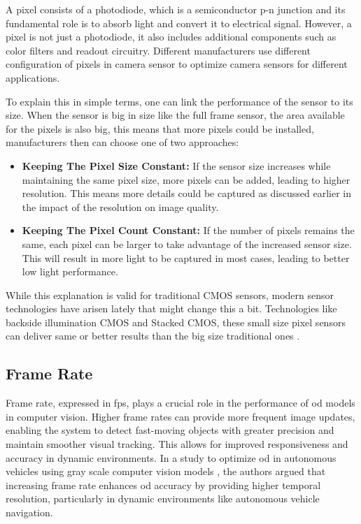 A pixel consists of a photodiode, which is a semiconductor p-n junction and its fundamental role is to absorb light and convert it to electrical signal.  However, a pixel is not just a photodiode, it also includes additional components such as color filters and readout circuitry. Different manufacturers use different configuration of pixels in camera sensor to optimize camera sensors for different applications.

To explain this in simple terms, one can link the performance of the sensor to its size. When the sensor is big in size like the full frame sensor, the area available for the pixels is also big, this means that more pixels could be installed, manufacturers then can choose one of two approaches:
\begin{itemize}
    \item \textbf{Keeping The Pixel Size Constant:} If the sensor size increases while maintaining the same pixel size, more pixels can be added, leading to higher resolution. This means more details could be captured as discussed earlier in the impact of the resolution on image quality.
    \item \textbf{Keeping The Pixel Count Constant:} If the number of pixels remains the same, each pixel can be larger to take advantage of the increased sensor size. This will result in more light to be captured in most cases, leading to better low light performance.
\end{itemize}


While this explanation is valid for traditional CMOS sensors, modern sensor technologies have arisen lately that might change this a bit. Technologies like backside illumination CMOS and Stacked CMOS, these small size pixel sensors can deliver same or better results than the big size traditional ones \cite{Fisher_CMOS_Types_2024}.

\subsection{Frame Rate}

Frame rate, expressed in \gls{fps}, plays a crucial role in the performance of \gls{od} models in computer vision. Higher frame rates can provide more frequent image updates, enabling the system to detect fast-moving objects with greater precision and maintain smoother visual tracking. This allows for improved responsiveness and accuracy in dynamic environments. In a study to optimize \gls{od} in autonomous vehicles using gray scale computer vision models \cite{FPS}, the authors argued that increasing frame rate enhances \gls{od} accuracy by providing higher temporal resolution, particularly in dynamic environments like autonomous vehicle navigation.

